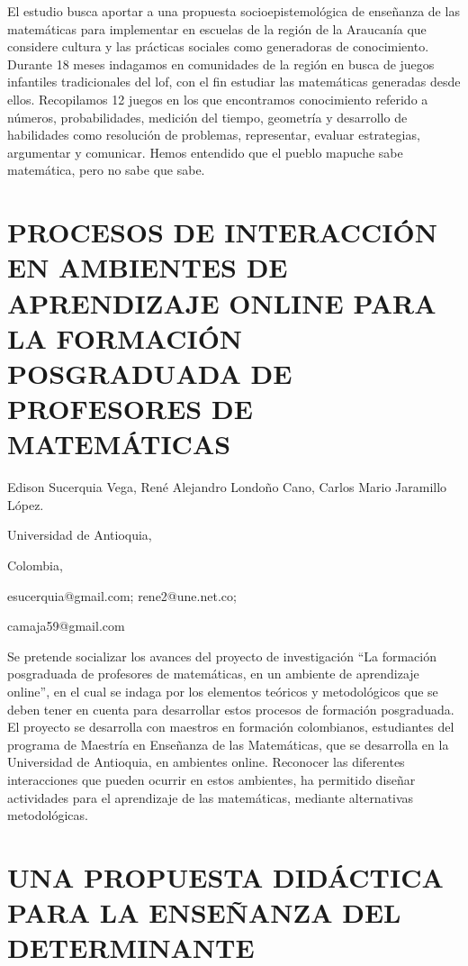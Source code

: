 El estudio busca aportar a una propuesta socioepistemológica de enseñanza
de las matemáticas para implementar en escuelas de la región de la
Araucanía que considere cultura y las prácticas sociales como generadoras
de conocimiento. Durante 18 meses indagamos en comunidades de la región
en busca de juegos infantiles tradicionales del lof, con el fin estudiar
las matemáticas generadas desde ellos. Recopilamos 12 juegos en los
que encontramos conocimiento referido a números, probabilidades, medición
del tiempo, geometría y desarrollo de habilidades como resolución
de problemas, representar, evaluar estrategias, argumentar y comunicar.
Hemos entendido que el pueblo mapuche sabe matemática, pero no sabe
que sabe. 


\section{PROCESOS DE INTERACCIÓN EN AMBIENTES DE APRENDIZAJE ONLINE PARA LA
FORMACIÓN POSGRADUADA DE PROFESORES DE MATEMÁTICAS}

\begin{datos}

Edison Sucerquia Vega, René Alejandro Londoño Cano, Carlos Mario Jaramillo
López.

Universidad de Antioquia,

Colombia,

esucerquia@gmail.com; rene2@une.net.co;

camaja59@gmail.com 

\end{datos}

Se pretende socializar los avances del proyecto de investigación “La
formación posgraduada de profesores de matemáticas, en un ambiente
de aprendizaje online”, en el cual se indaga por los elementos teóricos
y metodológicos que se deben tener en cuenta para desarrollar estos
procesos de formación posgraduada. El proyecto se desarrolla con maestros
en formación colombianos, estudiantes del programa de Maestría en
Enseñanza de las Matemáticas, que se desarrolla en la Universidad
de Antioquia, en ambientes online. Reconocer las diferentes interacciones
que pueden ocurrir en estos ambientes, ha permitido diseñar actividades
para el aprendizaje de las matemáticas, mediante alternativas metodológicas.


\section{UNA PROPUESTA DIDÁCTICA PARA LA ENSEÑANZA DEL DETERMINANTE}

